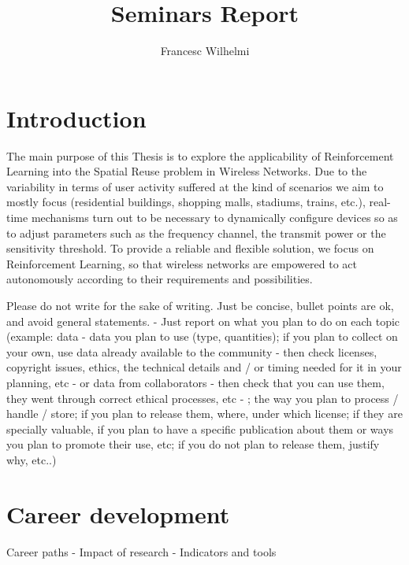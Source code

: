 \documentclass[12pt, a4paper,twoside]{article}
\title{Seminars Report}
\author{Francesc Wilhelmi}
\begin{document}
	\maketitle
	
	
	\section{Introduction}
	\label{section:introduction}		
		The main purpose of this Thesis is to explore the applicability of Reinforcement Learning into the Spatial Reuse problem in Wireless Networks. Due to the variability in terms of user activity suffered at the kind of scenarios we aim to mostly focus (residential buildings, shopping malls, stadiums, trains, etc.), real-time mechanisms turn out to be necessary to dynamically configure devices so as to adjust parameters such as the frequency channel, the transmit power or the sensitivity threshold. To provide a reliable and flexible solution, we focus on Reinforcement Learning, so that wireless networks are empowered to act autonomously according to their requirements and possibilities.
	
		Please do not write for the sake of writing. Just be concise, bullet points are ok, and avoid general statements. - Just report on what you plan to do on each topic (example: data - data you plan to use (type, quantities); if you plan to collect on your own, use data already available to the community - then check licenses, copyright issues, ethics, the technical details and / or timing needed for it in your planning, etc - or data from collaborators - then check that you can use them, they went through correct ethical processes, etc - ; the way you plan to process / handle / store; if you plan to release them, where, under which license; if they are specially valuable, if you plan to have a specific publication about them or ways you plan to promote their use, etc; if you do not plan to release them, justify why, etc..) 
		
	\section{Career development}
	\label{section:career}
	Career paths - Impact of research - Indicators and tools 
	
\end{document}
